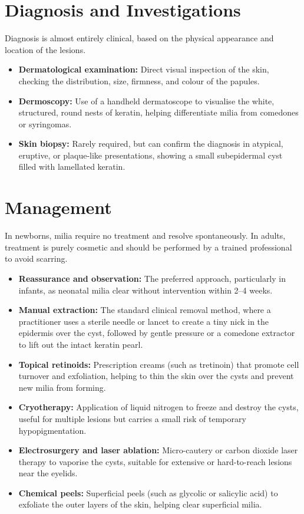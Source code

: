 \section*{Diagnosis and Investigations}
Diagnosis is almost entirely clinical, based on the physical appearance and location of the lesions.
\begin{itemize}
    \item \textbf{Dermatological examination:} Direct visual inspection of the skin, checking the distribution, size, firmness, and colour of the papules.
    \item \textbf{Dermoscopy:} Use of a handheld dermatoscope to visualise the white, structured, round nests of keratin, helping differentiate milia from comedones or syringomas.
    \item \textbf{Skin biopsy:} Rarely required, but can confirm the diagnosis in atypical, eruptive, or plaque-like presentations, showing a small subepidermal cyst filled with lamellated keratin.
\end{itemize}

\section*{Management}
In newborns, milia require no treatment and resolve spontaneously. In adults, treatment is purely cosmetic and should be performed by a trained professional to avoid scarring.
\begin{itemize}
    \item \textbf{Reassurance and observation:} The preferred approach, particularly in infants, as neonatal milia clear without intervention within 2--4 weeks.
    \item \textbf{Manual extraction:} The standard clinical removal method, where a practitioner uses a sterile needle or lancet to create a tiny nick in the epidermis over the cyst, followed by gentle pressure or a comedone extractor to lift out the intact keratin pearl.
    \item \textbf{Topical retinoids:} Prescription creams (such as tretinoin) that promote cell turnover and exfoliation, helping to thin the skin over the cysts and prevent new milia from forming.
    \item \textbf{Cryotherapy:} Application of liquid nitrogen to freeze and destroy the cysts, useful for multiple lesions but carries a small risk of temporary hypopigmentation.
    \item \textbf{Electrosurgery and laser ablation:} Micro-cautery or carbon dioxide laser therapy to vaporise the cysts, suitable for extensive or hard-to-reach lesions near the eyelids.
    \item \textbf{Chemical peels:} Superficial peels (such as glycolic or salicylic acid) to exfoliate the outer layers of the skin, helping clear superficial milia.
\end{itemize}

